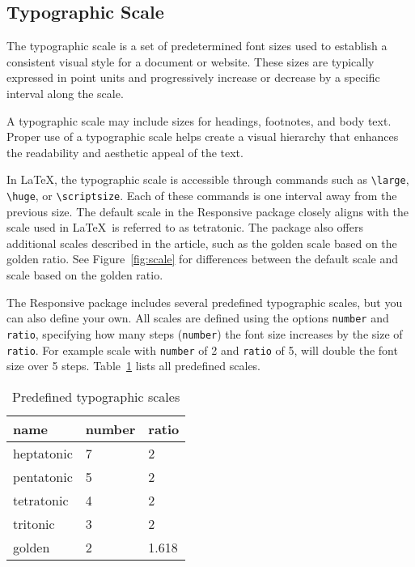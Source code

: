\documentclass{ltxdoc}
\begin{document}
\subsection{Typographic Scale}

The typographic scale is a set of predetermined font sizes used to establish a
consistent visual style for a document or website. These sizes are typically
expressed in point units and progressively increase or decrease by a specific
interval along the scale.

A typographic scale may include sizes for headings, footnotes, and body text.
Proper use of a typographic scale helps create a visual hierarchy that enhances
the readability and aesthetic appeal of the text. 

In \LaTeX, the typographic scale is accessible through commands such as \verb|\large|,
\verb|\huge|, or \verb|\scriptsize|. Each of these commands is one interval
away from the previous size. The default scale in the Responsive package
closely aligns with the scale used in \LaTeX\ is referred to as tetratonic.
The package also offers additional scales described in the
article, such as the golden scale based on the golden ratio. 
See Figure~\ref{fig:scale} for differences between the default scale and scale based on the 
golden ratio.

The Responsive package includes several predefined typographic scales, but you
can also define your own. All scales are defined using the options
\verb|number| and \verb|ratio|, specifying how many steps (\verb|number|) the
font size increases by the size of \verb|ratio|. For example scale with \verb|number| of 2
and \verb|ratio| of 5, will double the font size over 5 steps.
Table~\ref{tbl:scales} lists all predefined scales.

\begin{table}[htbp]
  \centering
  \begin{tabular}{l l l}
    \toprule
    name & number & ratio\\
    \midrule
    heptatonic & 7 & 2\\
    pentatonic & 5 & 2\\
    tetratonic & 4 & 2\\
    tritonic & 3 & 2\\
    golden & 2 & 1.618\\\bottomrule
  \end{tabular}
  \caption{Predefined typographic scales}\label{tbl:scales}
\end{table}
\end{document}
